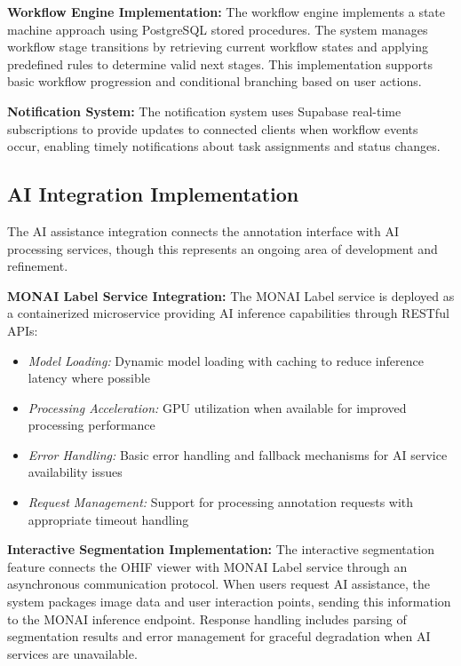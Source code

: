 \textbf{Workflow Engine Implementation:} The workflow engine implements a state machine approach using PostgreSQL stored procedures. The system manages workflow stage transitions by retrieving current workflow states and applying predefined rules to determine valid next stages. This implementation supports basic workflow progression and conditional branching based on user actions.

\textbf{Notification System:} The notification system uses Supabase real-time subscriptions to provide updates to connected clients when workflow events occur, enabling timely notifications about task assignments and status changes.

\subsection{AI Integration Implementation}

The AI assistance integration connects the annotation interface with AI processing services, though this represents an ongoing area of development and refinement.

\textbf{MONAI Label Service Integration:} The MONAI Label service \cite{monai2023} is deployed as a containerized microservice providing AI inference capabilities through RESTful APIs:

\begin{itemize}
    \item \textit{Model Loading:} Dynamic model loading with caching to reduce inference latency where possible
    \item \textit{Processing Acceleration:} GPU utilization when available for improved processing performance
    \item \textit{Error Handling:} Basic error handling and fallback mechanisms for AI service availability issues
    \item \textit{Request Management:} Support for processing annotation requests with appropriate timeout handling
\end{itemize}

\textbf{Interactive Segmentation Implementation:} The interactive segmentation feature connects the OHIF viewer with MONAI Label service through an asynchronous communication protocol. When users request AI assistance, the system packages image data and user interaction points, sending this information to the MONAI inference endpoint. Response handling includes parsing of segmentation results and error management for graceful degradation when AI services are unavailable.

